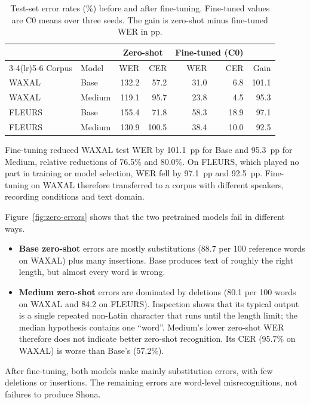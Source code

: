 \documentclass[12pt,a4paper]{report}
\begin{document}
\begin{table}[htbp]\centering\small
\caption{Test-set error rates (\%) before and after fine-tuning. Fine-tuned
values are C0 means over three seeds. The gain is zero-shot minus fine-tuned
WER in pp.}
\label{tab:zero}
\begin{tabular}{llrrrrr}\toprule
 & & \multicolumn{2}{c}{Zero-shot} & \multicolumn{2}{c}{Fine-tuned (C0)} & \\
\cmidrule(lr){3-4}\cmidrule(lr){5-6}
Corpus & Model & WER & CER & WER & CER & Gain\\\midrule
WAXAL & Base & 132.2 & 57.2 & 31.0 & 6.8 & 101.1 \\
WAXAL & Medium & 119.1 & 95.7 & 23.8 & 4.5 & 95.3 \\
FLEURS & Base & 155.4 & 71.8 & 58.3 & 18.9 & 97.1 \\
FLEURS & Medium & 130.9 & 100.5 & 38.4 & 10.0 & 92.5 \\
\bottomrule\end{tabular}
\end{table}

Fine-tuning reduced WAXAL test WER by 101.1~pp for Base and 95.3~pp for Medium,
relative reductions of 76.5\% and 80.0\%. On FLEURS, which played no part in
training or model selection, WER fell by 97.1~pp and 92.5~pp. Fine-tuning on
WAXAL therefore transferred to a corpus with different speakers, recording
conditions and text domain.

Figure~\ref{fig:zero-errors} shows that the two pretrained models fail in
different ways.
\begin{itemize}
\item \textbf{Base zero-shot} errors are mostly substitutions (88.7 per 100
reference words on WAXAL) plus many insertions. Base produces text of roughly
the right length, but almost every word is wrong.
\item \textbf{Medium zero-shot} errors are dominated by deletions (80.1 per 100
words on WAXAL and 84.2 on FLEURS). Inspection shows that its typical output is
a single repeated non-Latin character that runs until the length limit; the
median hypothesis contains one ``word''. Medium's lower zero-shot WER therefore
does not indicate better zero-shot recognition. Its CER (95.7\% on WAXAL) is
worse than Base's (57.2\%).
\end{itemize}
After fine-tuning, both models make mainly substitution errors, with few
deletions or insertions. The remaining errors are word-level misrecognitions,
not failures to produce Shona.
\end{document}
